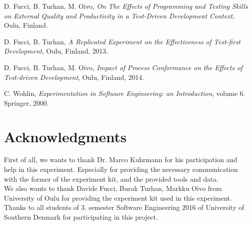 \documentclass{sig-alternate-05-2015}
\begin{document}
\begin{thebibliography}{3}

  D. Fucci, B. Turhan, M. Oivo,
  \emph{On The Effects of Programming and Testing Skills on External Quality and Productivity in a Test-Driven Development Context},
  Oulu, Finland.
  
  D. Fucci, B. Turhan,
  \emph{A Replicated Experiment on the Effectiveness of Test-first Development},
  Oulu, Finland,
  2013.
  
  D. Fucci, B. Turhan, M. Oivo,
  \emph{Impact of Process Conformance on the Effects of Test-driven Development},
  Oulu, Finland,
  2014.
  
  C. Wohlin,
  \emph{Experimentation in Software Engineering: an Introduction},
  volume 6. Springer,
  2000.

\end{thebibliography}

\section{Acknowledgments}

First of all, we wants to thank Dr. Marco Kuhrmann for his participation and help in this experiment. Especially for providing the necessary communication with the former of the experiment kit, and the provided tools and data.\\

We also wants to thank Davide Fucci, Burak Turhan, Markku Oivo from University of Oulu for providing the experiment kit used in this experiment.\\

Thanks to all students of 3. semester Software Engineering 2016 of University of Southern Denmark for participating in this project.
\end{document}
